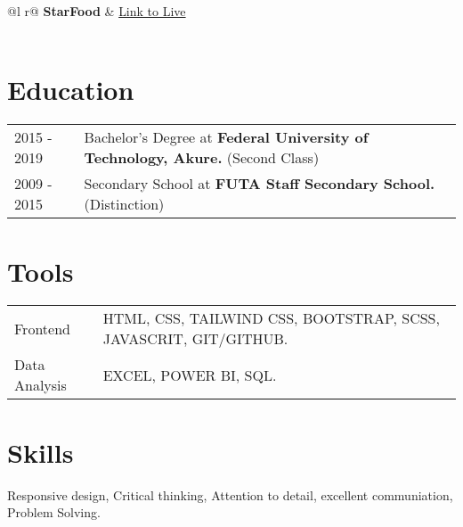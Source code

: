 \documentclass[a4paper,12pt]{article}
\begin{document}
\begin{tabularx}{\linewidth}{ @{}l r@{} }
\textbf{StarFood} & \hfill \href{https://harbystardev.github.io/StarFood/}{Link to Live} \\[3.75pt]
  \\
\end{tabularx}

\section{Education}
\begin{tabularx}{\linewidth}{@{}l X@{}}	
2015 - 2019 & Bachelor's Degree at \textbf{Federal University of Technology, Akure.} \hfill \normalsize (Second Class) \\

2009 - 2015 & Secondary School at \textbf{FUTA Staff Secondary School.} \hfill (Distinction) \\ 

\end{tabularx}

\section{Tools}
\begin{tabularx}{\linewidth}{@{}l X@{}}
Frontend &  \normalsize{HTML, CSS, TAILWIND CSS, BOOTSTRAP, SCSS, JAVASCRIT, GIT/GITHUB.}\\
Data Analysis  &  \normalsize{EXCEL, POWER BI, SQL.}\\  
\end{tabularx}

\section{Skills}

Responsive design, Critical thinking, Attention to detail, excellent communiation, Problem Solving.

\vfill
{}
\end{document}
